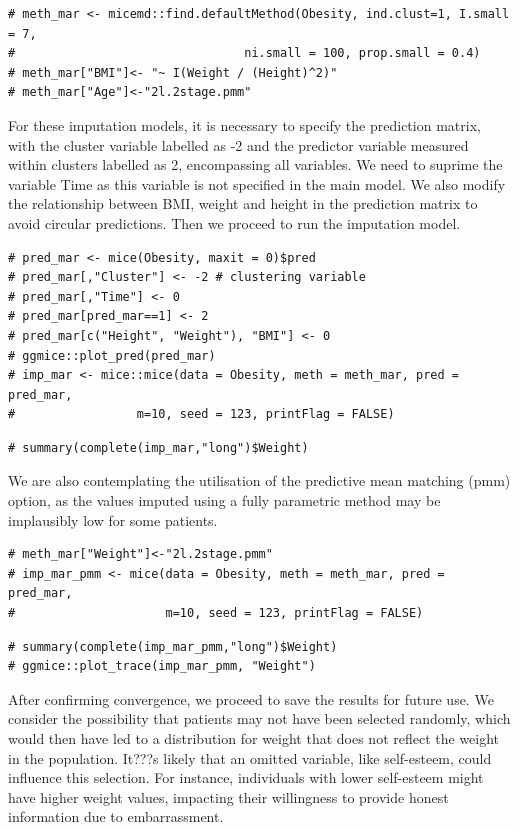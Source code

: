\documentclass[
  article]{jss}
\begin{document}
\begin{verbatim}
# meth_mar <- micemd::find.defaultMethod(Obesity, ind.clust=1, I.small = 7,
#                                ni.small = 100, prop.small = 0.4)
# meth_mar["BMI"]<- "~ I(Weight / (Height)^2)"
# meth_mar["Age"]<-"2l.2stage.pmm" 
\end{verbatim}

For these imputation models, it is necessary to specify the prediction
matrix, with the cluster variable labelled as -2 and the predictor
variable measured within clusters labelled as 2, encompassing all
variables. We need to suprime the variable Time as this variable is not
specified in the main model. We also modify the relationship between
BMI, weight and height in the prediction matrix to avoid circular
predictions. Then we proceed to run the imputation model.

\begin{verbatim}
# pred_mar <- mice(Obesity, maxit = 0)$pred 
# pred_mar[,"Cluster"] <- -2 # clustering variable
# pred_mar[,"Time"] <- 0
# pred_mar[pred_mar==1] <- 2
# pred_mar[c("Height", "Weight"), "BMI"] <- 0
# ggmice::plot_pred(pred_mar)
# imp_mar <- mice::mice(data = Obesity, meth = meth_mar, pred = pred_mar,
#                 m=10, seed = 123, printFlag = FALSE)
\end{verbatim}

\begin{verbatim}
# summary(complete(imp_mar,"long")$Weight)
\end{verbatim}

We are also contemplating the utilisation of the predictive mean
matching (pmm) option, as the values imputed using a fully parametric
method may be implausibly low for some patients.

\begin{verbatim}
# meth_mar["Weight"]<-"2l.2stage.pmm" 
# imp_mar_pmm <- mice(data = Obesity, meth = meth_mar, pred = pred_mar,
#                     m=10, seed = 123, printFlag = FALSE)
\end{verbatim}

\begin{verbatim}
# summary(complete(imp_mar_pmm,"long")$Weight)
# ggmice::plot_trace(imp_mar_pmm, "Weight")
\end{verbatim}

After confirming convergence, we proceed to save the results for future
use. We consider the possibility that patients may not have been
selected randomly, which would then have led to a distribution for
weight that does not reflect the weight in the population. It???s likely
that an omitted variable, like self-esteem, could influence this
selection. For instance, individuals with lower self-esteem might have
higher weight values, impacting their willingness to provide honest
information due to embarrassment.
\end{document}
